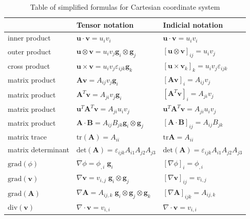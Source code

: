 \documentclass{digitaldynamics}
\def\vect#1{\bm{#1}}
\def\tensor#1{\bm{#1}}
\begin{document}
\begin{table}[]
\centering
\caption{Table of simplified formulas for Cartesian coordinate system}
\label{tab:my-table}
\begin{tabular}{lll}
\hline\hline
& Tensor notation     &    Indicial notation  \\ 
\hline\hline
\scriptsize inner product & $\vect{u} \cdot \vect{v} = u_i v_i$     &    $\vect{u} \cdot \vect{v} = u_i v_i$  \\ 
\scriptsize outer product & $\vect{u} \otimes \vect{v} = u_i v_j  \vect{g}_i \otimes \vect{g}_j$  &   $[\vect{u} \otimes \vect{v}]_{ij} = u_i v_j$   \\
\scriptsize cross product & $\vect{u} \times \vect{v} = u_i v_j \varepsilon_{ijk} \vect{g}_k$  &   $[\vect{u} \times \vect{v}_{k}]_k = u_i v_j \varepsilon_{ijk}$   \\
\hline
\scriptsize matrix product     & $\tensor{A} \vect{v} = A_{ij} v_j \vect{g}_i$  &   $[\tensor{A} \vect{v}]_i = A_{ij} v_j $   \\
\scriptsize matrix product     & $\tensor{A}^T \vect{v} = A_{ji} v_j \vect{g}_i$  &   $[\tensor{A}^T \vect{v}]_i = A_{ji} v_j $   \\
\scriptsize matrix product     & $\vect{u}^T \tensor{A}^T \vect{v} = A_{ji} u_i v_j$    &   $\vect{u}^T \tensor{A}^T \vect{v} = A_{ji} u_i v_j $    \\
\scriptsize matrix product     & $\tensor{A}\cdot\tensor{B} = A_{ij} B_{jk} \vect{g}_i \otimes \vect{g}_j$  &  $[\tensor{A}\cdot\tensor{B}]_{ij} = A_{ij} B_{jk}$ \\
\scriptsize matrix trace       & $\mathrm{tr}(\tensor{A}) = A_{ii}$ &  $\mathrm{tr}\tensor{A} = A_{ii}$ \\
\scriptsize matrix determinant & $\mathrm{det}(\tensor{A}) = \varepsilon_{ijk} A_{i1} A_{j2} A_{j3}$  &  $\mathrm{det}(\tensor{A}) = \varepsilon_{ijk} A_{i1} A_{j2} A_{j3}$ \\
\hline
\scriptsize $\mathrm{grad}(\phi)$          & $ \nabla \phi = \phi_{,i}\;\vect{g}_i$ &  $[\nabla \phi]_i = \phi_{,i}$ \\
\scriptsize $\mathrm{grad}(\vect{v})$      & $ \nabla \vect{v} = v_{i,j}\;\vect{g}_i\otimes\vect{g}_j$ &  $[\nabla \vect{v}]_{ij} = v_{i,j}$ \\
\scriptsize $\mathrm{grad}(\tensor{A})$    & $ \nabla \tensor{A} = A_{ij,k}\;\vect{g}_i\otimes\vect{g}_j\otimes\vect{g}_k$   &  $[\nabla \tensor{A}]_{ijk} = A_{ij,k}$ \\
\scriptsize $\mathrm{div}(\vect{v})$       & $ \nabla \cdot \vect{v} = v_{i,i}$ &  $ \nabla \cdot \vect{v} = v_{i,i}$ \\

\end{tabular}
\end{table}
\end{document}
